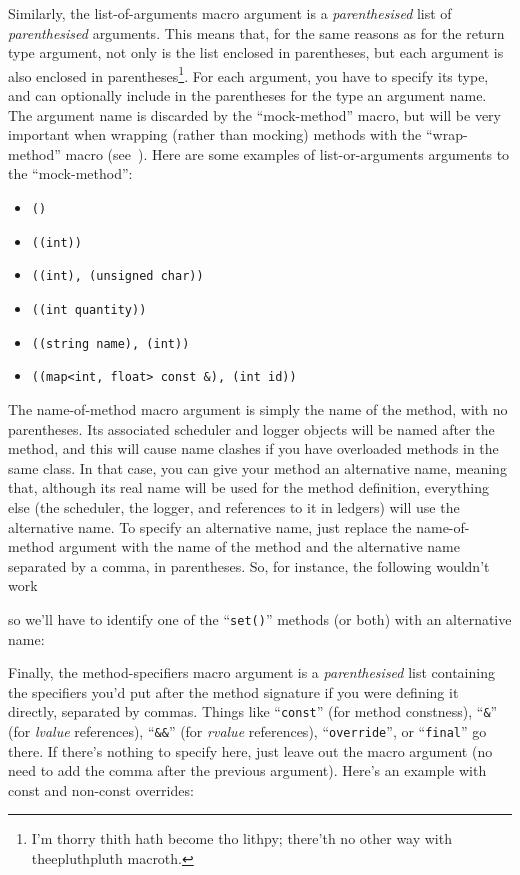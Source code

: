 \documentclass[twoside, a4paper, article]{memoir}
\newcommand\typesetexample[1]{%
  \typesetexamplesource{#1}
}
\providecommand\typesetexamplesource[1]{%
}
\begin{document}
Similarly, the list-of-arguments macro argument is a \emph{parenthesised} list
of \emph{parenthesised} arguments.  This means that, for the same reasons as
for the return type argument, not only is the list enclosed in parentheses, but
each argument is also enclosed in parentheses\footnote{I'm thorry thith hath
  become tho lithpy; there'th no other way with theepluthpluth macroth.}.  For
each argument, you have to specify its type, and can optionally include in the
parentheses for the type an argument name.  The argument name is discarded by
the ``mock-method'' macro, but will be very important when wrapping (rather
than mocking) methods with the ``wrap-method'' macro
(see~).  Here are some examples of list-or-arguments
arguments to the ``mock-method'':
\begin{itemize}
\item \texttt{()}
\item \texttt{((int))}
\item \texttt{((int), (unsigned char))}
\item \texttt{((int quantity))}
\item \texttt{((string name), (int))}
\item \texttt{((map<int, float> const \&), (int id))}
\end{itemize}

The name-of-method macro argument is simply the name of the method, with no
parentheses.  Its associated scheduler and logger objects will be named after
the method, and this will cause name clashes if you have overloaded methods in
the same class.  In that case, you can give your method an alternative name,
meaning that, although its real name will be used for the method definition,
everything else (the scheduler, the logger, and references to it in ledgers)
will use the alternative name.  To specify an alternative name, just replace
the name-of-method argument with the name of the method and the alternative
name separated by a comma, in parentheses.  So, for instance, the following
wouldn't work

\typesetexample{mock-class-name-clash}

so we'll have to identify one of the ``\texttt{set()}'' methods (or both) with
an alternative name:

\typesetexample{mock-class-name-clash-avoided}

Finally, the method-specifiers macro argument is a \emph{parenthesised} list
containing the specifiers you'd put after the method signature if you were
defining it directly, separated by commas.  Things like ``\texttt{const}'' (for
method constness), ``\texttt{\&}'' (for \emph{lvalue} references),
``\texttt{\&\&}'' (for \emph{rvalue} references), ``\texttt{override}'', or
``\texttt{final}'' go there.  If there's nothing to specify here, just leave
out the macro argument (no need to add the comma after the previous argument).
Here's an example with const and non-const overrides:
\end{document}

